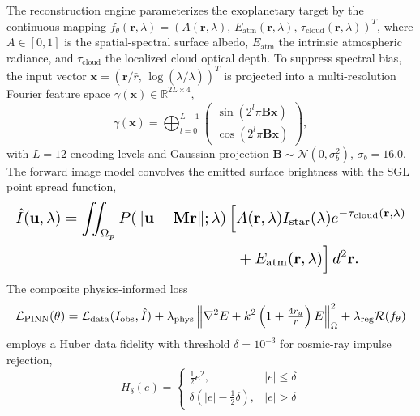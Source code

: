 \documentclass[10pt,twocolumn]{IEEEtran}
\begin{document}
The reconstruction engine parameterizes the exoplanetary target by the
continuous mapping
$f_\theta(\mathbf{r},\lambda)=\left(A(\mathbf{r},\lambda),\,
E_{\mathrm{atm}}(\mathbf{r},\lambda),\,
\tau_{\mathrm{cloud}}(\mathbf{r},\lambda)\right)^{T}$,
where $A\in[0,1]$ is the spatial-spectral surface albedo,
$E_{\mathrm{atm}}$ the intrinsic atmospheric radiance, and
$\tau_{\mathrm{cloud}}$ the localized cloud optical depth. To suppress
spectral bias, the input vector
$\mathbf{x}=(\mathbf{r}/\bar{r},\,\log(\lambda/\bar{\lambda}))^{T}$ is
projected into a multi-resolution Fourier feature space
$\gamma(\mathbf{x})\in\mathbb{R}^{2L\times4}$,
\begin{equation}
\gamma(\mathbf{x})=\bigoplus_{l=0}^{L-1}
\begin{pmatrix}\sin(2^{l}\pi\mathbf{B}\mathbf{x})\\
\cos(2^{l}\pi\mathbf{B}\mathbf{x})\end{pmatrix},
\label{eq:fourier_features}
\end{equation}
with $L=12$ encoding levels and Gaussian projection
$\mathbf{B}\sim\mathcal{N}(0,\sigma_b^{2})$, $\sigma_b=16.0$. The forward
image model convolves the emitted surface brightness with the SGL point
spread function,
\begin{equation}
\resizebox{\columnwidth}{!}{$
\begin{aligned}
\hat{I}(\mathbf{u},\lambda)=\iint_{\Omega_p}
P\!\left(\|\mathbf{u}-\mathbf{M}\mathbf{r}\|;\lambda\right)
\Big[&A(\mathbf{r},\lambda)I_{\mathrm{star}}(\lambda)
e^{-\tau_{\mathrm{cloud}}(\mathbf{r},\lambda)}\\
&+E_{\mathrm{atm}}(\mathbf{r},\lambda)\Big]\,d^{2}\mathbf{r}.
\end{aligned}$}
\label{eq:forward_image}
\end{equation}
The composite physics-informed loss
\begin{equation}
\resizebox{\columnwidth}{!}{$
\displaystyle \mathcal{L}_{\mathrm{PINN}}(\theta)=
\mathcal{L}_{\mathrm{data}}(I_{\mathrm{obs}},\hat{I})
+\lambda_{\mathrm{phys}}\left\|\nabla^{2}E
+k^{2}\left(1+\tfrac{4r_g}{r}\right)E\right\|_{\Omega}^{2}
+\lambda_{\mathrm{reg}}\mathcal{R}(f_\theta)$}
\label{eq:pinn_loss}
\end{equation}
employs a Huber data fidelity with threshold $\delta=10^{-3}$ for
cosmic-ray impulse rejection,
\begin{equation}
H_\delta(e)=
\begin{cases}
\tfrac{1}{2}e^{2}, & |e|\leq\delta\\
\delta\left(|e|-\tfrac{1}{2}\delta\right), & |e|>\delta
\end{cases}
\label{eq:huber}
\end{equation}
\end{document}
